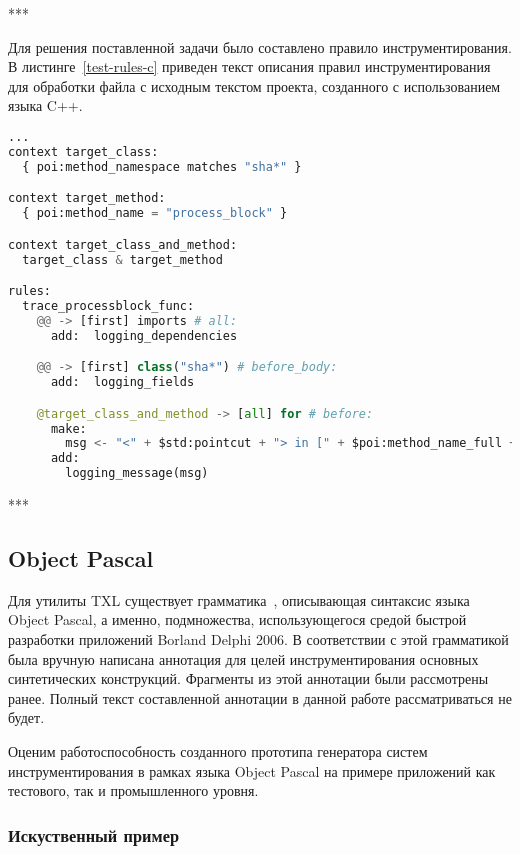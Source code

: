 ***

Для решения поставленной задачи было составлено правило инструментирования.
В листинге~\ref{test-rules-c} приведен текст описания правил инструментирования для обработки файла с исходным текстом проекта, созданного с использованием языка C++.

\begin{lstlisting}[frame=single, language=Python, label={test-rules-c}, caption={Описание правил инструментирования. C++-проект.}]
...
context target_class:
  { poi:method_namespace matches "sha*" }

context target_method:
  { poi:method_name = "process_block" }

context target_class_and_method:
  target_class & target_method

rules:
  trace_processblock_func:
    @@ -> [first] imports # all:
      add:  logging_dependencies

    @@ -> [first] class("sha*") # before_body:
      add:  logging_fields

    @target_class_and_method -> [all] for # before:
      make:
        msg <- "<" + $std:pointcut + "> in [" + $poi:method_name_full + "] method";
      add:
        logging_message(msg)
\end{lstlisting}

***

\subsection{Object Pascal}

Для утилиты TXL существует грамматика~\cite{txl-resources}, описывающая синтаксис языка Object Pascal, а именно, подмножества, использующегося средой быстрой разработки приложений Borland Delphi 2006.
В соответствии с этой грамматикой была вручную написана аннотация для целей инструментирования основных синтетических конструкций.
Фрагменты из этой аннотации были рассмотрены ранее.
Полный текст составленной аннотации в данной работе рассматриваться не будет.

Оценим работоспособность созданного прототипа генератора систем инструментирования в рамках языка Object Pascal на примере приложений как тестового, так и промышленного уровня.

\subsubsection{Искуственный пример}

